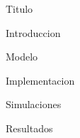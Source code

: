\documentclass[12pt]{article}
\begin{document}

    {Titulo}

    \frontmatter


    \renewcommand*\contentsname{Índice}
    \tableofcontents

    \mainmatter

    {Introduccion}
    \newpage

    {Modelo}
    \newpage

    {Implementacion}
    \newpage

    {Simulaciones}
    \newpage

    {Resultados}
    \newpage

    \newpage
    \printbibliography[heading = bibintoc, title = Referencias]    %

\end{document}
